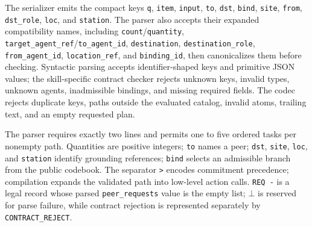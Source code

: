 \documentclass[10pt]{article}
\newcommand{\artifact}[1]{\texttt{#1}}
\begin{document}
The serializer emits the compact keys \artifact{q}, \artifact{item}, \artifact{input}, \artifact{to}, \artifact{dst}, \artifact{bind}, \artifact{site}, \artifact{from}, \artifact{dst\_role}, \artifact{loc}, and \artifact{station}. The parser also accepts their expanded compatibility names, including \artifact{count}/\artifact{quantity}, \artifact{target\_agent\_ref}/\artifact{to\_agent\_id}, \artifact{destination}, \artifact{destination\_role}, \artifact{from\_agent\_id}, \artifact{location\_ref}, and \artifact{binding\_id}, then canonicalizes them before checking. Syntactic parsing accepts identifier-shaped keys and primitive JSON values; the skill-specific contract checker rejects unknown keys, invalid types, unknown agents, inadmissible bindings, and missing required fields. The codec rejects duplicate keys, paths outside the evaluated catalog, invalid atoms, trailing text, and an empty requested plan.

The parser requires exactly two lines and permits one to five ordered tasks per nonempty path. Quantities are positive integers; \artifact{to} names a peer; \artifact{dst}, \artifact{site}, \artifact{loc}, and \artifact{station} identify grounding references; \artifact{bind} selects an admissible branch from the public codebook. The separator \artifact{>} encodes commitment precedence; compilation expands the validated path into low-level action calls. \artifact{REQ -} is a legal record whose parsed \artifact{peer\_requests} value is the empty list; $\bot$ is reserved for parse failure, while contract rejection is represented separately by \artifact{CONTRACT\_REJECT}.
\end{document}
